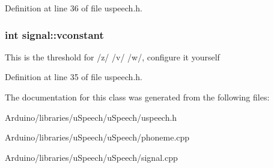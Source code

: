 Definition at line 36 of file uspeech.\-h.

\hypertarget{classsignal_ad717d6555e102392063d04affb78b95d}{
\subsubsection[{vconstant}]{\setlength{\rightskip}{0pt plus 5cm}int signal\-::vconstant}}\label{classsignal_ad717d6555e102392063d04affb78b95d}
This is the threshold for /z/ /v/ /w/, configure it yourself 

Definition at line 35 of file uspeech.\-h.



The documentation for this class was generated from the following files\-:\begin{DoxyCompactItemize}
\item 
Arduino/libraries/u\-Speech/u\-Speech/uspeech.\-h\item 
Arduino/libraries/u\-Speech/u\-Speech/phoneme.\-cpp\item 
Arduino/libraries/u\-Speech/u\-Speech/signal.\-cpp\end{DoxyCompactItemize}
